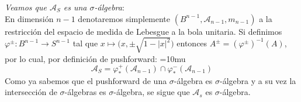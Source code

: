 \begin{sol}
\emph{Veamos que \(\mathcal{A}_S\) es una \(\sigma\)-álgebra}:\\
En dimensión $n-1$ denotaremos simplemente $(B^{n-1},\mathcal{A}_{n-1},m_{n-1})$ a la restricción del espacio de medida de Lebesgue a la bola unitaria. Si definimos $\varphi^{\pm} \colon B^{n-1} \to S^{n-1}$ tal que $x \mapsto \bigl(x,\pm \sqrt{1-|x|^2}\bigr)$ entonces $A^\pm = (\varphi^\pm)^{-1}(A)$, por lo cual, por definición de pushforward:
{\thickmuskip=10mu
\[
\mathcal{A}_S = \varphi^+_*(\mathcal{A}_{n-1}) \cap \varphi^-_*(\mathcal{A}_{n-1})
\]
}%
Como ya sabemos que el pushforward de una $\sigma$-álgebra es $\sigma$-álgebra y a su vez la intersección de $\sigma$-álgebras es $\sigma$-álgebra, se sigue que $\mathcal{A}_s$ es $\sigma$-álgebra.


\end{sol}
